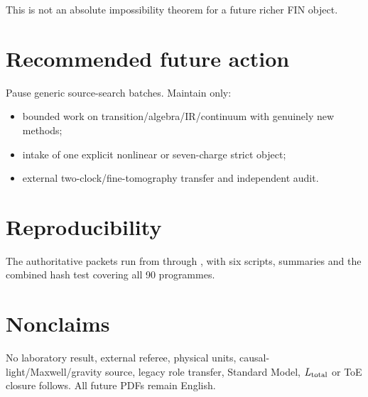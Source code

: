 \documentclass[11pt,a4paper]{article}
\begin{document}
This is not an absolute impossibility theorem for a future richer FIN object.

\section{Recommended future action}
Pause generic source-search batches. Maintain only:
\begin{itemize}
\item bounded work on transition/algebra/IR/continuum with genuinely new methods;
\item intake of one explicit nonlinear or seven-charge strict object;
\item external two-clock/fine-tomography transfer and independent audit.
\end{itemize}

\appendix\section{Reproducibility}
The authoritative packets run from  through , with six scripts, summaries and the combined hash test covering all 90 programmes.

\section{Nonclaims}
No laboratory result, external referee, physical units, causal-light/Maxwell/gravity source, legacy role transfer, Standard Model, $L_{\rm total}$ or ToE closure follows. All future PDFs remain English.
\end{document}

